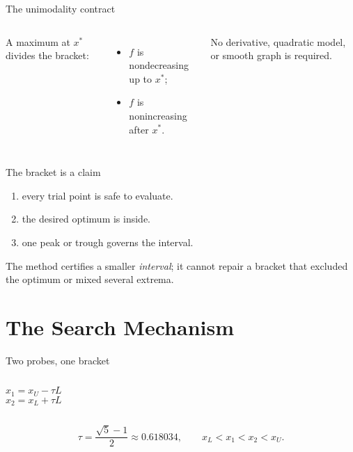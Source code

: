 \documentclass[aspectratio=169,11pt,t]{beamer}
\begin{document}
\begin{frame}{The unimodality contract}
  \begin{columns}[c,onlytextwidth]
      \centering
      

      A maximum at \(x^*\) divides the bracket:
      \begin{itemize}
        \item \(f\) is nondecreasing up to \(x^*\);
        \item \(f\) is nonincreasing after \(x^*\).
      \end{itemize}
      \begin{keyidea}
        No derivative, quadratic model, or smooth graph is required.
      \end{keyidea}
  \end{columns}
\end{frame}

\begin{frame}{The bracket is a claim}
  \begin{enumerate}
    \item {} every trial point is safe to evaluate.
    \item {} the desired optimum is inside.
    \item {} one peak or trough governs the interval.
  \end{enumerate}

  \vspace{0.08cm}
  \begin{keyidea}
    The method certifies a smaller \emph{interval}; it cannot repair a bracket
    that excluded the optimum or mixed several extrema.
  \end{keyidea}
\end{frame}

\section{The Search Mechanism}

\begin{frame}{Two probes, one bracket}
  \centering
  \vspace{0.10cm}
  

  \vspace{0.45cm}
  \begin{columns}[T,onlytextwidth]
      \[
        x_1=x_U-\tau L
      \]
      \[
        x_2=x_L+\tau L
      \]
  \end{columns}
  \vspace{-0.08cm}
  \[
    \tau=\frac{\sqrt5-1}{2}\approx0.618034,
    \qquad x_L<x_1<x_2<x_U.
  \]
\end{frame}
\end{document}
